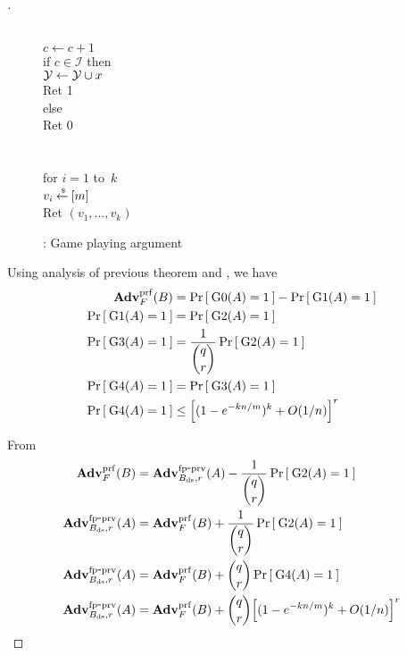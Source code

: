 \begin{proof}[]
\begin{figure}
{{%
\\
$c \gets c+1$\\
if $c \in \mathcal{I}$ then\\
\nudge ${\cal Y} \gets {\cal Y} \cup {x}$\\
\nudge Ret 1\\
else\\
\nudge Ret 0 \\\\
%
\\
for $i = 1$ to~$k$\\
\nudge $v_i  {\:\stackrel{{\scriptscriptstyle \hspace{0.2em}\$}} {\leftarrow}\:} [m]$\\
Ret $\left(v_1,\ldots,v_k\right)$
}
}
\caption{: Game playing argument}\label{fig:GameT2}
\end{figure}
\noindent
Using analysis of previous theorem and , we have
\begin{align}\label{eq:1T2}
\mathbf{Adv}^{\mathrm{prf}}_{F}(B) &= \Pr\left[\: \text{G0}(A)=1 \:\right] - \Pr\left[\: \text{G1}(A)=1 \:\right] \\
\Pr\left[\: \text{G1}(A)=1 \:\right] &= \Pr\left[\: \text{G2}(A)=1 \:\right]\\
\Pr\left[\: \text{G3}(A)=1 \:\right] &= \frac{1}{\dbinom{q}{r}}\Pr\left[\: \text{G2}(A)=1 \:\right]\\
\Pr\left[\: \text{G4}(A)=1 \:\right] &= \Pr\left[\: \text{G3}(A)=1 \:\right]\\
\Pr\left[\: \text{G4}(A)=1 \:\right] & \leq \Big[(1-e^{-kn/m})^k +O(1/n)\Big]^r
\end{align}

\noindent
From 
\begin{align}
\nonumber \mathbf{Adv}^{\mathrm{prf}}_{F}(B) &= \mathrm{\mathbf{Adv}}^{\mathrm{fp\mbox{-}prv}}_{B_\mathrm{ds},r}(A) - \frac{1}{\dbinom{q}{r}}\Pr\left[\: \text{G2}(A)=1 \:\right]\\
\nonumber \mathrm{\mathbf{Adv}}^{\mathrm{fp\mbox{-}prv}}_{B_\mathrm{ds},r}(A) &= \mathbf{Adv}^{\mathrm{prf}}_{F}(B) + \frac{1}{\dbinom{q}{r}}\Pr\left[\: \text{G2}(A)=1 \:\right]\\
\nonumber \mathrm{\mathbf{Adv}}^{\mathrm{fp\mbox{-}prv}}_{B_\mathrm{ds},r}(A) &= \mathbf{Adv}^{\mathrm{prf}}_{F}(B) +  \dbinom{q}{r}\Pr\left[\: \text{G4}(A)=1 \:\right]\\
\mathrm{\mathbf{Adv}}^{\mathrm{fp\mbox{-}prv}}_{B_\mathrm{ds},r}(A) &= \mathbf{Adv}^{\mathrm{prf}}_{F}(B) +  \dbinom{q}{r}\Big[(1-e^{-kn/m})^k +O(1/n)\Big]^r
\end{align}

\end{proof}

